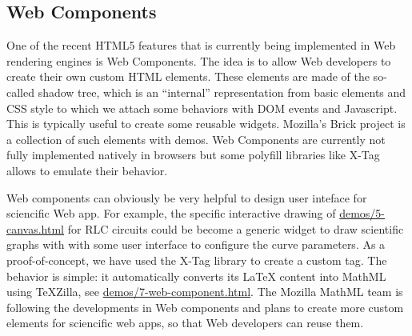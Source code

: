 \subsection{Web Components}

One of the recent HTML5 features that is currently being implemented in Web
rendering engines is Web Components. The idea is to allow Web developers to
create their own custom HTML elements. These elements are made of the so-called
shadow tree, which is an ``internal'' representation from basic elements and CSS
style to which we attach some behaviors with DOM events and Javascript. This is
typically useful to create some reusable widgets. Mozilla's Brick project
is a collection of such elements with demos. Web Components are currently
not fully implemented natively in browsers but some polyfill libraries like
X-Tag allows to emulate their behavior.

Web components can obviously be very helpful to design user inteface for
sciencific Web app. For example, the specific interactive drawing of
\href{http://fred-wang.github.io/MathUI2014/demos/5-canvas.html}{demos/5-canvas.html} for RLC circuits could be become a generic widget 
{\tt <x-graph>} to draw scientific graphs with with some user interface to
configure the curve parameters. As a proof-of-concept, we have used the X-Tag
library to create a custom {\tt <x-tex>} tag. The behavior is simple: it
automatically converts its LaTeX content into MathML using TeXZilla, see
\href{http://fred-wang.github.io/MathUI2014/demos/7-web-component.html}{demos/7-web-component.html}.
The Mozilla MathML team is following the developments in Web components and
plans to create more custom elements for sciencific web apps, so that Web
developers can reuse them.
